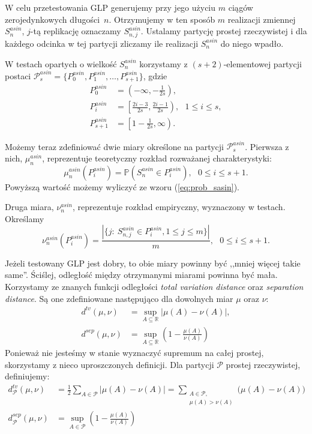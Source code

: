 \documentclass[a4paper,11pt,oneside]{book}
\newcommand{\Pro}[1]{\mathbb{P}\left(#1\right)}
\newcommand{\Sasin}[1]{S^{asin}_#1}
\theoremstyle{definition}
\begin{document}
W celu przetestowania GLP generujemy przy jego użyciu $m$ ciągów zerojedynkowych długości~$n$. Otrzymujemy w ten sposób $m$ realizacji zmiennej $\Sasin{n}$, $j$-tą replikację oznaczamy $\Sasin{{n,j}}$. Ustalamy partycję prostej rzeczywistej i dla każdego odcinka w tej partycji zliczamy ile realizacji $\Sasin{n}$ do niego wpadło.

W testach opartych o wielkość $\Sasin{n}$ korzystamy z $(s+2)$-elementowej partycji postaci $\mathcal{P}^{asin}_s = \{ P^{asin}_0, P^{asin}_1, \ldots, P^{asin}_{s+1}\}$, gdzie
\begin{equation*}
\begin{split}
  P^{asin}_0 &= \left(-\infty, -\frac{1}{2s}\right),\\
  P^{asin}_i &= \left[\frac{2i-3}{2s}, \frac{2i-1}{2s} \right),\ \ \ 1 \leq i \leq s,\\
  P^{asin}_{s+1} &= \left[1- \frac{1}{2s}, \infty\right).
\end{split}
\end{equation*}

Możemy teraz zdefiniować dwie miary określone na partycji  $\mathcal{P}^{asin}_s$. Pierwsza z nich, $ \mu^{asin}_n$, reprezentuje teoretyczny rozkład rozważanej charakterystyki:
\begin{equation}
 \mu^{asin}_n \left( P^{asin}_i \right) = \Pro{\Sasin{n} \in P^{asin}_i},\ \ \ 0 \leq i \leq s+1.
\end{equation}
Powyższą wartość możemy wyliczyć ze wzoru (\ref{eq:prob_sasin}).

Druga miara, $\nu^{asin}_n$,  reprezentuje rozkład empiryczny, wyznaczony w testach. Określamy
\begin{equation}
 \nu^{asin}_n \left( P^{asin}_i \right) = \frac{|\{ j:\ \Sasin{{n,j}} \in  P^{asin}_i, 1 \leq j \leq m\}|}{m},\ \ \ 0 \leq i \leq s+1.
\end{equation}


Jeżeli testowany GLP jest dobry, to obie miary powinny być ,,mniej więcej takie same''. Ściślej, odległość między otrzymanymi miarami powinna być mała. Korzystamy ze znanych funkcji odległości \textit{total variation distance} oraz \textit{separation distance}. Są one zdefiniowane następująco dla dowolnych miar $\mu$ oraz $\nu$:
\begin{align}
 d^{tv}(\mu, \nu) &= \sup_{A \subseteq \mathbb{R}} |\mu(A) - \nu(A)|,\\
 d^{sep}(\mu, \nu) &= \sup_{A \subseteq \mathbb{R}} \left(1 - \frac{\mu(A)}{\nu(A)}\right)
\end{align}
Ponieważ nie jesteśmy w stanie wyznaczyć supremum na całej prostej, skorzystamy z nieco uproszczonych definicji. Dla partycji $\mathcal{P}$ prostej rzeczywistej, definiujemy:
\begin{align}
 d^{tv}_\mathcal{P}(\mu, \nu) &= \frac{1}{2} \sum_{A \in \mathcal{P}} |\mu(A) - \nu(A)|
    = \sum_{\substack{A \in \mathcal{P},\\ \mu(A) >\nu(A)}} \Big(\mu(A) - \nu(A)\Big)\\
 d^{sep}_\mathcal{P}(\mu, \nu) &= \sup_{A \in \mathcal{P}}\left(1 - \frac{\mu(A)}{\nu(A)}\right)
\end{align}
\end{document}
